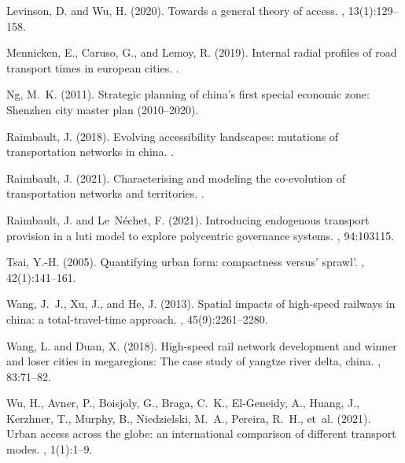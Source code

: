 \documentclass{article}
\begin{document}
\begin{thebibliography}{}
Levinson, D. and Wu, H. (2020).
\newblock Towards a general theory of access.
, 13(1):129--158.

Mennicken, E., Caruso, G., and Lemoy, R. (2019).
\newblock Internal radial profiles of road transport times in european cities.
.

Ng, M.~K. (2011).
\newblock Strategic planning of china's first special economic zone: Shenzhen
  city master plan (2010--2020).

Raimbault, J. (2018).
\newblock Evolving accessibility landscapes: mutations of transportation
  networks in china.
.

Raimbault, J. (2021).
\newblock Characterising and modeling the co-evolution of transportation
  networks and territories.
.

Raimbault, J. and Le~N{\'e}chet, F. (2021).
\newblock Introducing endogenous transport provision in a luti model to explore
  polycentric governance systems.
, 94:103115.

Tsai, Y.-H. (2005).
\newblock Quantifying urban form: compactness versus' sprawl'.
, 42(1):141--161.

Wang, J.~J., Xu, J., and He, J. (2013).
\newblock Spatial impacts of high-speed railways in china: a total-travel-time
  approach.
, 45(9):2261--2280.

Wang, L. and Duan, X. (2018).
\newblock High-speed rail network development and winner and loser cities in
  megaregions: The case study of yangtze river delta, china.
, 83:71--82.

Wu, H., Avner, P., Boisjoly, G., Braga, C.~K., El-Geneidy, A., Huang, J.,
  Kerzhner, T., Murphy, B., Niedzielski, M.~A., Pereira, R.~H., et~al. (2021).
\newblock Urban access across the globe: an international comparison of
  different transport modes.
, 1(1):1--9.

\end{thebibliography}




\end{document}
